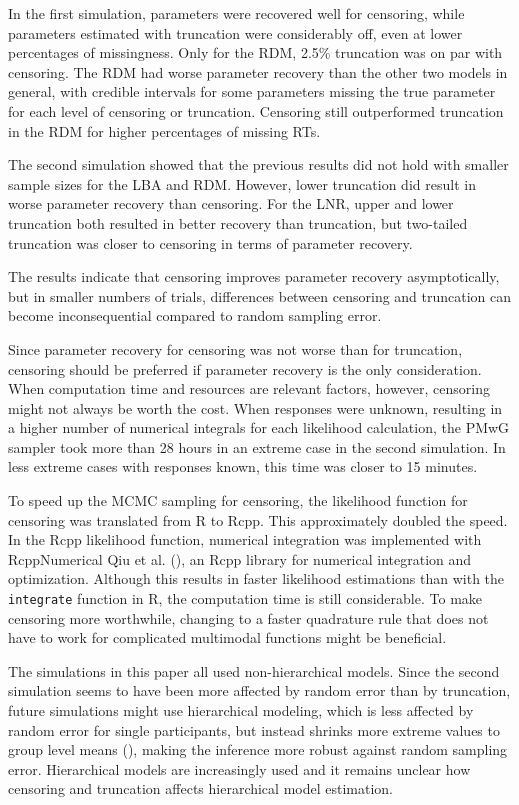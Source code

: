 \documentclass[
  stu,
  floatsintext,
  longtable,
  nolmodern,
  notxfonts,
  notimes,
  draftfirst,
  colorlinks=true,linkcolor=blue,citecolor=blue,urlcolor=blue]{apa7}
\begin{document}
In the first simulation, parameters were recovered well for censoring,
while parameters estimated with truncation were considerably off, even
at lower percentages of missingness. Only for the RDM, 2.5\% truncation
was on par with censoring. The RDM had worse parameter recovery than the
other two models in general, with credible intervals for some parameters
missing the true parameter for each level of censoring or truncation.
Censoring still outperformed truncation in the RDM for higher
percentages of missing RTs.

The second simulation showed that the previous results did not hold with
smaller sample sizes for the LBA and RDM. However, lower truncation did
result in worse parameter recovery than censoring. For the LNR, upper
and lower truncation both resulted in better recovery than truncation,
but two-tailed truncation was closer to censoring in terms of parameter
recovery.

The results indicate that censoring improves parameter recovery
asymptotically, but in smaller numbers of trials, differences between
censoring and truncation can become inconsequential compared to random
sampling error.

Since parameter recovery for censoring was not worse than for
truncation, censoring should be preferred if parameter recovery is the
only consideration. When computation time and resources are relevant
factors, however, censoring might not always be worth the cost. When
responses were unknown, resulting in a higher number of numerical
integrals for each likelihood calculation, the PMwG sampler took more
than 28 hours in an extreme case in the second simulation. In less
extreme cases with responses known, this time was closer to 15 minutes.

To speed up the MCMC sampling for censoring, the likelihood function for
censoring was translated from R to Rcpp. This approximately doubled the
speed. In the Rcpp likelihood function, numerical integration was
implemented with RcppNumerical Qiu et al.
(), an Rcpp library for numerical
integration and optimization. Although this results in faster likelihood
estimations than with the \texttt{integrate} function in R, the
computation time is still considerable. To make censoring more
worthwhile, changing to a faster quadrature rule that does not have to
work for complicated multimodal functions might be beneficial.

The simulations in this paper all used non-hierarchical models. Since
the second simulation seems to have been more affected by random error
than by truncation, future simulations might use hierarchical modeling,
which is less affected by random error for single participants, but
instead shrinks more extreme values to group level means
(), making the inference
more robust against random sampling error. Hierarchical models are
increasingly used and it remains unclear how censoring and truncation
affects hierarchical model estimation.
\end{document}
